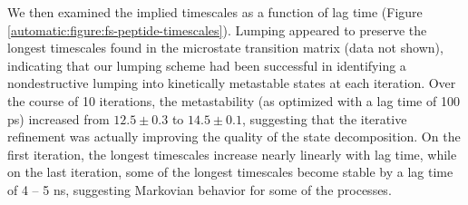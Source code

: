 We then examined the implied timescales as a function of lag time (Figure \ref{automatic:figure:fs-peptide-timescales}).
Lumping appeared to preserve the longest timescales found in the microstate transition matrix (data not shown), indicating that our lumping scheme had been successful in identifying a nondestructive lumping into kinetically metastable states at each iteration.
Over the course of 10 iterations, the metastability (as optimized with a lag time of 100 ps) increased from $12.5 \pm 0.3$ to $14.5 \pm 0.1$, suggesting that the iterative refinement was actually improving the quality of the state decomposition.
On the first iteration, the longest timescales increase nearly linearly with lag time, while on the last iteration, some of the longest timescales become stable by a lag time of 4 -- 5 ns, suggesting Markovian behavior for some of the processes.

